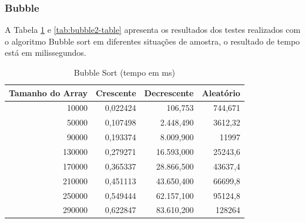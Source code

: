 \documentclass[a4paper, 12pt]{article}
\begin{document}
\subsubsection{Bubble}
A Tabela \ref{tab:bubble1-table} e \ref{tab:bubble2-table}  apresenta os resultados dos testes realizados com o algoritmo Bubble sort em diferentes situações de amostra, o resultado de tempo está em milissegundos.

\begin{longtable}[c]{@{}rrrr@{}}
				\caption{Bubble Sort (tempo em ms)}
	\label{tab:bubble1-table}\\
	\toprule
	\multicolumn{1}{l}{\textbf{Tamanho do Array}} & \multicolumn{1}{c}{\textbf{Crescente}} & \multicolumn{1}{c}{\textbf{Decrescente}} & \multicolumn{1}{c}{\textbf{Aleatório}} \\* \midrule
	\endfirsthead
	\endhead
	\multicolumn{1}{|r|}{10000}                   & \multicolumn{1}{r|}{0,022424}          & \multicolumn{1}{r|}{106,753}             & \multicolumn{1}{r|}{744,671}           \\* \midrule
	\multicolumn{1}{|r|}{50000}                   & \multicolumn{1}{r|}{0,107498}          & \multicolumn{1}{r|}{2.448,490}           & \multicolumn{1}{r|}{3612,32}           \\* \midrule
	\multicolumn{1}{|r|}{90000}                   & \multicolumn{1}{r|}{0,193374}          & \multicolumn{1}{r|}{8.009,900}           & \multicolumn{1}{r|}{11997}             \\* \midrule
	\multicolumn{1}{|r|}{130000}                  & \multicolumn{1}{r|}{0,279271}          & \multicolumn{1}{r|}{16.593,000}          & \multicolumn{1}{r|}{25243,6}           \\* \midrule
	\multicolumn{1}{|r|}{170000}                  & \multicolumn{1}{r|}{0,365337}          & \multicolumn{1}{r|}{28.866,500}          & \multicolumn{1}{r|}{43637,4}           \\* \midrule
	\multicolumn{1}{|r|}{210000}                  & \multicolumn{1}{r|}{0,451113}          & \multicolumn{1}{r|}{43.650,400}          & \multicolumn{1}{r|}{66699,8}           \\* \midrule
	\multicolumn{1}{|r|}{250000}                  & \multicolumn{1}{r|}{0,549444}          & \multicolumn{1}{r|}{62.157,100}          & \multicolumn{1}{r|}{95124,8}           \\* \midrule
	\multicolumn{1}{|r|}{290000}                  & \multicolumn{1}{r|}{0,622847}          & \multicolumn{1}{r|}{83.610,200}          & \multicolumn{1}{r|}{128264}            \\* \midrule

\end{longtable}
\end{document}
